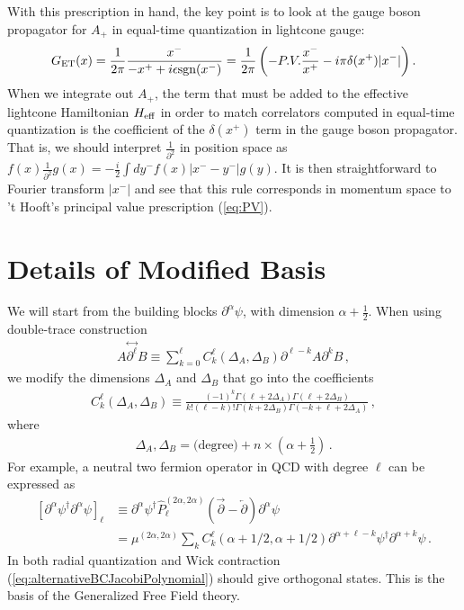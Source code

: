 \documentclass[12pt]{article}
\newcommand{\be}{\begin{eqnarray}}
\newcommand{\ee}{\end{eqnarray}}
\renewcommand{\d}{\partial}
\newcommand{\nn}{\nonumber}
\begin{document}
With this prescription in hand, the key point is to look at the gauge boson propagator for $A_+$ in equal-time quantization in lightcone gauge:
\be
G_{\rm ET}(x) = \frac{1}{2\pi}\frac{x^-}{-x^+ +  i \epsilon {\rm sgn}( x^-)} = \frac{1}{2\pi} \left( - P.V. \frac{x^-}{x^+}  - i \pi \delta(x^+) |x^-| \right) .
\ee
When we integrate out $A_+$, the term that must be added to the effective lightcone Hamiltonian $H_{\rm eff}$ in order to match correlators computed in equal-time quantization is the coefficient of the $\delta(x^+)$ term in the gauge boson propagator.  That is, we should interpret $\frac{1}{\partial^2}$ in position space as $f(x) \frac{1}{\partial^2} g(x) = - \frac{i}{2}  \int dy^- f(x) |x^- - y^-| g(y)$.  It is then straightforward to Fourier transform $|x^-|$ and see that this rule corresponds in momentum space to 't Hooft's principal value prescription (\ref{eq:PV}).  



\section{Details of Modified Basis}
\label{app:ModifiedBasis}

    We will start from the building blocks $\d^\alpha\psi$, with dimension $\alpha+\frac{1}{2}$. When using double-trace construction
    \begin{align}
        A \overset{\leftrightarrow}{\d^\ell} B
        \equiv \sum_{k=0}^\ell C^\ell_k (\Delta_A,\Delta_B) \d^{\ell-k}A \d^{k} B \, ,
    \end{align}
    we modify the dimensions $\Delta_A$ and $\Delta_B$ that go into the coefficients
    \begin{align}
        C^\ell_k (\Delta_A,\Delta_B) \equiv \frac{(-1)^k \Gamma \left(\ell +2 \Delta _A\right) \Gamma \left(\ell +2 \Delta _B\right)}{k! (\ell
       -k)! \Gamma \left(k+2 \Delta _B\right) \Gamma \left(-k+\ell +2 \Delta _A\right)}\, ,
    \end{align}
    where
    \begin{align}
    \Delta_A, \Delta_B = \text{(degree)} + n \times \left(\alpha+\frac{1}{2}\right) \, .
    \end{align}
    For example, a neutral two fermion operator in QCD with degree $\ell$ can be expressed as
    \begin{align}
    \label{eq:alternativeBCJacobiPolynomial}
    [\d^\alpha\psi^\dagger \d^\alpha\psi]_\ell &\equiv
    \d^\alpha\psi^\dagger \widehat{P}_{\ell}^{(2\alpha,2\alpha)}
    \left(
    \overrightarrow{\d} - \overleftarrow{\d}
    \right) \d^\alpha\psi \nn \\
    &= \mu^{(2\alpha,2\alpha)}
    \sum_k 
    C^\ell_k (\alpha+1/2,\alpha+1/2)
    \d^{\alpha+\ell-k}\psi^\dagger
    \d^{\alpha+k}\psi \, .
    \end{align}
    In both radial quantization and Wick contraction (\ref{eq:alternativeBCJacobiPolynomial}) should give orthogonal states. This is the basis of the Generalized Free Field theory.
\end{document}

